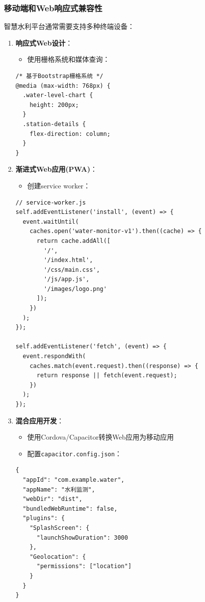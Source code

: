 \subsubsection{移动端和Web响应式兼容性}\label{ux79fbux52a8ux7aefux548cwebux54cdux5e94ux5f0fux517cux5bb9ux6027}

智慧水利平台通常需要支持多种终端设备：

\begin{enumerate}
\def\labelenumi{\arabic{enumi}.}
\tightlist
\item
  \textbf{响应式Web设计}：

  \begin{itemize}
  \tightlist
  \item
    使用栅格系统和媒体查询：
  \end{itemize}

\begin{lstlisting}
/* 基于Bootstrap栅格系统 */
@media (max-width: 768px) {
  .water-level-chart {
    height: 200px;
  }
  .station-details {
    flex-direction: column;
  }
}
\end{lstlisting}
\item
  \textbf{渐进式Web应用(PWA)}：

  \begin{itemize}
  \tightlist
  \item
    创建service worker：
  \end{itemize}

\begin{lstlisting}
// service-worker.js
self.addEventListener('install', (event) => {
  event.waitUntil(
    caches.open('water-monitor-v1').then((cache) => {
      return cache.addAll([
        '/',
        '/index.html',
        '/css/main.css',
        '/js/app.js',
        '/images/logo.png'
      ]);
    })
  );
});

self.addEventListener('fetch', (event) => {
  event.respondWith(
    caches.match(event.request).then((response) => {
      return response || fetch(event.request);
    })
  );
});
\end{lstlisting}
\item
  \textbf{混合应用开发}：

  \begin{itemize}
  \tightlist
  \item
    使用Cordova/Capacitor转换Web应用为移动应用
  \item
    配置\passthrough{\lstinline!capacitor.config.json!}：
  \end{itemize}

\begin{lstlisting}
{
  "appId": "com.example.water",
  "appName": "水利监测",
  "webDir": "dist",
  "bundledWebRuntime": false,
  "plugins": {
    "SplashScreen": {
      "launchShowDuration": 3000
    },
    "Geolocation": {
      "permissions": ["location"]
    }
  }
}
\end{lstlisting}
\end{enumerate}

